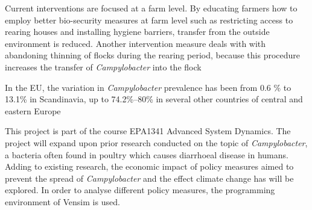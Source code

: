 Current interventions are focused at a farm level. By educating farmers how to employ better bio-security measures at farm level such as restricting access to rearing houses and installing hygiene barriers, transfer from the outside environment is reduced. Another intervention measure deals with with abandoning thinning of flocks during the rearing period, because this procedure increases the transfer of \textit{Campylobacter} into the flock
    


In the EU, the variation in \textit{Campylobacter} prevalence has been from 0.6 \% to 13.1\% in Scandinavia, up to 74.2\%–80\% in  several  other  countries of central and eastern Europe \cite{skarp_campylobacteriosis_2015} 
















This project is part of the course EPA1341 Advanced System Dynamics. The project will expand upon prior research conducted on the topic of \textit{Campylobacter}, a bacteria often found in poultry which causes diarrhoeal disease in humans. Adding to existing research, the economic impact of policy measures aimed to prevent the spread of  \textit{Campylobacter} and the effect climate change has will be explored. In order to analyse different policy measures, the programming environment of Vensim is used. 

